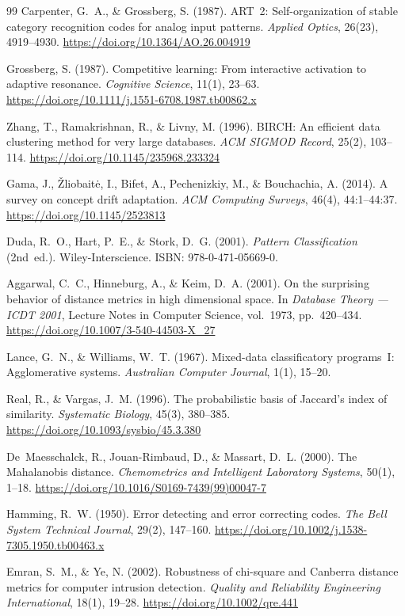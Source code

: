 \documentclass[11pt,a4paper]{article}
\theoremstyle{definition}
\theoremstyle{plain}
\theoremstyle{remark}
\begin{document}
\begin{thebibliography}{99}
Carpenter, G.~A., \& Grossberg, S. (1987).
ART~2: Self-organization of stable category recognition codes for analog input patterns.
\emph{Applied Optics}, 26(23), 4919--4930.
\url{https://doi.org/10.1364/AO.26.004919}

Grossberg, S. (1987).
Competitive learning: From interactive activation to adaptive resonance.
\emph{Cognitive Science}, 11(1), 23--63.
\url{https://doi.org/10.1111/j.1551-6708.1987.tb00862.x}

Zhang, T., Ramakrishnan, R., \& Livny, M. (1996).
BIRCH: An efficient data clustering method for very large databases.
\emph{ACM SIGMOD Record}, 25(2), 103--114.
\url{https://doi.org/10.1145/235968.233324}

Gama, J., \v{Z}liobait\.{e}, I., Bifet, A., Pechenizkiy, M., \& Bouchachia, A. (2014).
A survey on concept drift adaptation.
\emph{ACM Computing Surveys}, 46(4), 44:1--44:37.
\url{https://doi.org/10.1145/2523813}

Duda, R.~O., Hart, P.~E., \& Stork, D.~G. (2001).
\emph{Pattern Classification} (2nd~ed.).
Wiley-Interscience.
ISBN: 978-0-471-05669-0.

Aggarwal, C.~C., Hinneburg, A., \& Keim, D.~A. (2001).
On the surprising behavior of distance metrics in high dimensional space.
In \emph{Database Theory --- ICDT 2001}, Lecture Notes in Computer Science, vol.~1973, pp.~420--434.
\url{https://doi.org/10.1007/3-540-44503-X\_27}

Lance, G.~N., \& Williams, W.~T. (1967).
Mixed-data classificatory programs~I: Agglomerative systems.
\emph{Australian Computer Journal}, 1(1), 15--20.

Real, R., \& Vargas, J.~M. (1996).
The probabilistic basis of Jaccard's index of similarity.
\emph{Systematic Biology}, 45(3), 380--385.
\url{https://doi.org/10.1093/sysbio/45.3.380}

De~Maesschalck, R., Jouan-Rimbaud, D., \& Massart, D.~L. (2000).
The Mahalanobis distance.
\emph{Chemometrics and Intelligent Laboratory Systems}, 50(1), 1--18.
\url{https://doi.org/10.1016/S0169-7439(99)00047-7}

Hamming, R.~W. (1950).
Error detecting and error correcting codes.
\emph{The Bell System Technical Journal}, 29(2), 147--160.
\url{https://doi.org/10.1002/j.1538-7305.1950.tb00463.x}

Emran, S.~M., \& Ye, N. (2002).
Robustness of chi-square and Canberra distance metrics for computer intrusion detection.
\emph{Quality and Reliability Engineering International}, 18(1), 19--28.
\url{https://doi.org/10.1002/qre.441}

\end{thebibliography}
\end{document}
